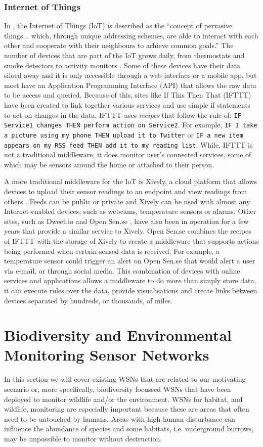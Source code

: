 	\subsubsection{Internet of Things}
		In \cite{giusto2010internet}, the Internet of Things (IoT) is described as the ``concept of pervasive things... which, through unique addressing schemes, are able to interact with each other and cooperate with their neighbours to achieve common goals.'' The number of devices that are part of the IoT grows daily, from thermostats and smoke detectors \cite{nest} to activity monitors \cite{fitbit}. Some of these devices have their data siloed away and it is only accessible through a web interface or a mobile app, but most have an Application Programming Interface (API) that allows the raw data to be access and queried. Because of this, sites like If This Then That (IFTTT) \cite{ifttt} have been created to link together various services and use simple if statements to act on changes in the data. IFTTT uses \textit{recipes} that follow the rule of: \lstinline{IF Service1 changes THEN perform action on Service2}. For example, \lstinline{IF I take a picture using my phone THEN upload it to Twitter} or \lstinline{IF a new item appears on my RSS feed THEN add it to my reading list}. While, IFTTT is not a traditional middleware, it does monitor user's connected services, some of which may be sensors around the home or attached to their person.

		A more traditional middleware for the IoT is Xively, a cloud platform that allows devices to upload their sensor readings to an endpoint and view readings from others \cite{xively}. Feeds can be public or private and Xively can be used with almost any Internet-enabled devices, such as webcams, temperature sensors or alarms. Other sites, such as Dweet.io \cite{dweet} and Open Sen.se \cite{opensense}, have also been in operation for a few years that provide a similar service to Xively. Open Sen.se combines the recipes of IFTTT with the storage of Xively to create a middleware that supports actions being performed when certain sensed data is received. For example, a temperature sensor could trigger an alert on Open Sen.se that would alert a user via e-mail, or through social media. This combination of devices with online services and applications allows a middleware to do more than simply store data, it can execute rules over the data, provide visualisations and create links between devices separated by hundreds, or thousands, of miles.


\section{Biodiversity and Environmental Monitoring Sensor Networks} \label{bg:bsn}
	In this section we will cover existing WSNs that are related to our motivating scenario or, more specifically, biodiversity focussed WSNs that have been deployed to monitor wildlife and/or the environment. WSNs for habitat, and wildlife, monitoring are especially important because these are areas that often need to be untouched by humans. Areas with high human disturbance can influence the abundance of species and some habitats, i.e. underground burrows, may be impossible to monitor without destruction. 
	
